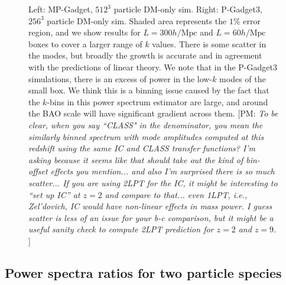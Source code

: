 \documentclass[]{article}
\def\pvm#1{[PM: {\it #1}] }
\begin{document}
\begin{figure}[h]
	\caption{Left: MP-Gadget, $512^3$ particle DM-only sim. Right: P-Gadget3, $256^3$ particle DM-only
sim. Shaded area represents the $1\%$ error region, and we show results for $L=300h/\mathrm{Mpc}$ and
$L=60h/\mathrm{Mpc}$ boxes to cover a larger range of $k$ values. There is some scatter in the modes, but broadly the growth is accurate and in agreement with the predictions of linear theory. We note that in the P-Gadget3 simulations, there is an excess of power in the low-$k$ modes of the small box. We think this is a binning issue caused by the fact that the $k$-bins in this power spectrum estimator are large, and around the BAO scale will have significant gradient across them.
\pvm{To be clear, when you say ``CLASS" in the denominator, you mean the 
similarly binned spectrum with mode amplitudes computed at this 
redshift using the same IC and CLASS transfer functions? 
I'm asking because it seems like that
should take out the kind of bin-offset effects you mention... and also I'm 
surprised there is so much scatter... If you are using 2LPT for the IC, it 
might be interesting to ``set up IC'' at $z=2$ and compare to that... even
1LPT, i.e., Zel'dovich, IC would have non-linear effects in mass power. I guess
scatter is less of an issue for your b-c comparison, but it might be a useful
sanity check to compute 2LPT prediction for $z=2$ and $z=9$. }}
\end{figure}

\clearpage


\subsection{Power spectra ratios for two particle species}

\end{document}
